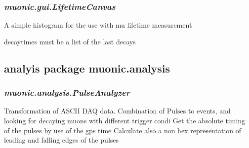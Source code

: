 \documentclass[letterpaper,10pt,english]{sphinxmanual}
\begin{document}
\subsubsection{\emph{muonic.gui.LifetimeCanvas}}
\label{muonic:muonic-gui-lifetimecanvas}\label{muonic:module-muonic.gui.LifetimeCanvas}

\begin{fulllineitems}
\label{muonic:muonic.gui.LifetimeCanvas.LifetimeCanvas}
A simple histogram for the use with mu lifetime
measurement

\begin{fulllineitems}
\label{muonic:muonic.gui.LifetimeCanvas.LifetimeCanvas.show_fit}
\end{fulllineitems}


\begin{fulllineitems}
\label{muonic:muonic.gui.LifetimeCanvas.LifetimeCanvas.update_plot}
decaytimes must be a list of the last decays

\end{fulllineitems}


\end{fulllineitems}



\subsection{analyis package muonic.analysis}
\label{muonic:module-muonic.analysis}\label{muonic:analyis-package-muonic-analysis}

\subsubsection{\emph{muonic.analysis.PulseAnalyzer}}
\label{muonic:muonic-analysis-pulseanalyzer}
Transformation of ASCII DAQ data. Combination of Pulses to events, and looking for decaying muons with different trigger condi
\label{muonic:module-muonic.analysis.PulseAnalyzer}
Get the absolute timing of the pulses
by use of the gps time
Calculate also a non hex representation of
leading and falling edges of the pulses
\end{document}
